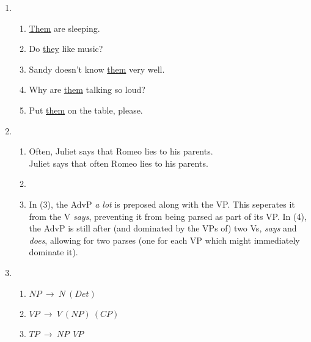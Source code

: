 \documentclass[doc,12pt]{apa6}
\begin{document}
\begin{enumerate}[resume]
	\item
	\begin{enumerate}
		\item \underline{Them} are sleeping.
		\item Do \underline{they} like music?
		\item Sandy doesn't know \underline{them} very well.
		\item Why are \underline{them} talking so loud?
		\item Put \underline{them} on the table, please.
	\end{enumerate}

	\item 
	\begin{enumerate}
		\item
			Often, Juliet says that Romeo lies to his parents. \\
			Juliet says that often Romeo lies to his parents.

		\item \-\\
		\vspace*{-36pt}

		\-\vspace{24pt}


		\item In (3), the AdvP \textit{a lot} is preposed along with the VP.
			This seperates it from the V \textit{says}, preventing it from
			being parsed as part of its VP. In (4), the AdvP is still after
			(and dominated by the VPs of) two Vs, \textit{says} and
			\textit{does}, allowing for two parses (one for each VP which might
			immediately dominate it).
	\end{enumerate}

	\item
	\begin{enumerate}
		\item $NP~\rightarrow{}~N~(Det)$
		\item $VP~\rightarrow{}~V~(NP)~(CP)$
		\item $TP~\rightarrow{}~NP~~VP$


\end{enumerate}
\end{enumerate}
\end{document}
